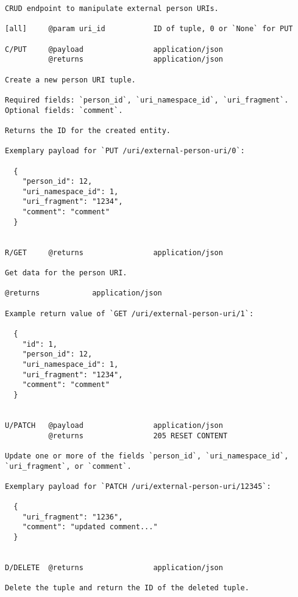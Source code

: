 {\small\begin{verbatim}CRUD endpoint to manipulate external person URIs.

[all]     @param uri_id           ID of tuple, 0 or `None` for PUT

C/PUT     @payload                application/json
          @returns                application/json

Create a new person URI tuple.

Required fields: `person_id`, `uri_namespace_id`, `uri_fragment`.
Optional fields: `comment`.

Returns the ID for the created entity.

Exemplary payload for `PUT /uri/external-person-uri/0`:

  {
    "person_id": 12,
    "uri_namespace_id": 1,
    "uri_fragment": "1234",
    "comment": "comment"
  }


R/GET     @returns                application/json

Get data for the person URI.

@returns            application/json

Example return value of `GET /uri/external-person-uri/1`:

  {
    "id": 1,
    "person_id": 12,
    "uri_namespace_id": 1,
    "uri_fragment": "1234",
    "comment": "comment"
  }


U/PATCH   @payload                application/json
          @returns                205 RESET CONTENT

Update one or more of the fields `person_id`, `uri_namespace_id`,
`uri_fragment`, or `comment`.

Exemplary payload for `PATCH /uri/external-person-uri/12345`:

  {
    "uri_fragment": "1236",
    "comment": "updated comment..."
  }


D/DELETE  @returns                application/json

Delete the tuple and return the ID of the deleted tuple.
\end{verbatim}}
